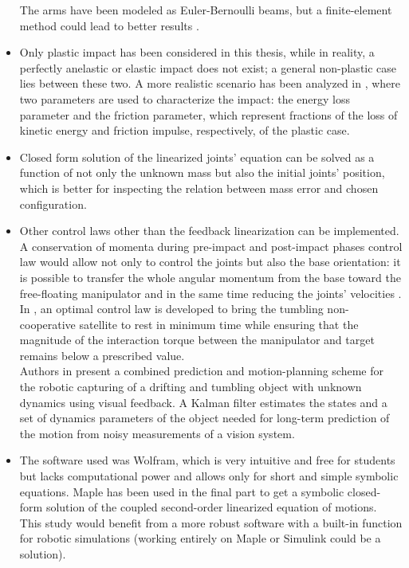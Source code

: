 \documentclass[a4paper,12pt,oneside]{report}
\begin{document}
\begin{itemize}
    The arms have been modeled as Euler-Bernoulli beams, but a finite-element method could lead to better results \cite{fifteen}.
  \item Only plastic impact has been considered in this thesis, while in reality, a perfectly anelastic or elastic impact does not exist; a general non-plastic case lies between these two. A more realistic scenario has been analyzed in \cite{fourteen}, where two parameters are used to characterize the impact: the energy loss parameter and the friction parameter, which represent fractions of the loss of kinetic energy and friction impulse, respectively, of the plastic case.
  \item Closed form solution of the linearized joints' equation can be solved as a function of not only the unknown mass but also the initial joints' position, which is better for inspecting the relation between mass error and chosen configuration.
  \item Other control laws other than the feedback linearization can be implemented. A conservation of momenta during pre-impact and post-impact phases control law would allow not only to control the joints but also the base orientation: it is possible to transfer the whole angular momentum from the base toward the free-floating manipulator and in the same time reducing the joints' velocities \cite{twentythree}.\\
    In \cite{twentyfour}, an optimal control law is developed to bring the tumbling non-cooperative satellite to rest in minimum time while ensuring that the magnitude of the interaction torque between the manipulator and target remains below a prescribed value.\\
    Authors in \cite{twentyfive} present a combined prediction and motion-planning scheme for the robotic capturing of a drifting and tumbling object with unknown dynamics using visual feedback. A Kalman filter estimates the states and a set of dynamics parameters of the object needed for long-term prediction of the motion from noisy measurements of a vision system.
  \item The software used was Wolfram, which is very intuitive and free for students but lacks computational power and allows only for short and simple symbolic equations. Maple has been used in the final part to get a symbolic closed-form solution of the coupled second-order linearized equation of motions.\\
    This study would benefit from a more robust software with a built-in function for robotic simulations (working entirely on Maple or Simulink could be a solution).
\end{itemize}
\end{document}
